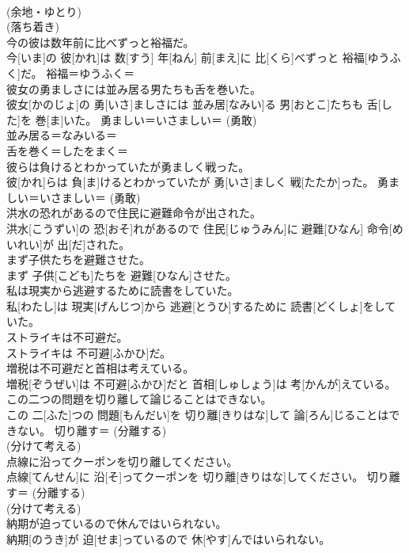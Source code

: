 \documentclass[8pt]{extreport}
\begin{document}
\begin{CJK}{UTF8}{min}
{\\	(余地・ゆとり) 
\\	(落ち着き) 
\\	今の彼は数年前に比べずっと裕福だ。	
\\	今[いま]の 彼[かれ]は 数[すう] 年[ねん] 前[まえ]に 比[くら]べずっと 裕福[ゆうふく]だ。	裕福＝ゆうふく＝ 
\\	彼女の勇ましさには並み居る男たちも舌を巻いた。	
\\	彼女[かのじょ]の 勇[いさ]ましさには 並み居[なみい]る 男[おとこ]たちも 舌[した]を 巻[ま]いた。	勇ましい＝いさましい＝ (勇敢) 
\\	並み居る＝なみいる＝ 
\\	舌を巻く＝したをまく＝ 
\\	彼らは負けるとわかっていたが勇ましく戦った。	
\\	彼[かれ]らは 負[ま]けるとわかっていたが 勇[いさ]ましく 戦[たたか]った。	勇ましい＝いさましい＝ (勇敢) 
\\	洪水の恐れがあるので住民に避難命令が出された。	
\\	洪水[こうずい]の 恐[おそ]れがあるので 住民[じゅうみん]に 避難[ひなん] 命令[めいれい]が 出[だ]された。	
\\	まず子供たちを避難させた。	
\\	まず 子供[こども]たちを 避難[ひなん]させた。	
\\	私は現実から逃避するために読書をしていた。	
\\	私[わたし]は 現実[げんじつ]から 逃避[とうひ]するために 読書[どくしょ]をしていた。	
\\	ストライキは不可避だ。	
\\	ストライキは 不可避[ふかひ]だ。	
\\	増税は不可避だと首相は考えている。	
\\	増税[ぞうぜい]は 不可避[ふかひ]だと 首相[しゅしょう]は 考[かんが]えている。	
\\	この二つの問題を切り離して論じることはできない。	
\\	この 二[ふた]つの 問題[もんだい]を 切り離[きりはな]して 論[ろん]じることはできない。	切り離す＝ (分離する) 
\\	(分けて考える) 
\\	点線に沿ってクーポンを切り離してください。	
\\	点線[てんせん]に 沿[そ]ってクーポンを 切り離[きりはな]してください。	切り離す＝ (分離する) 
\\	(分けて考える) 
\\	納期が迫っているので休んではいられない。	
\\	納期[のうき]が 迫[せま]っているので 休[やす]んではいられない。	
}
\end{CJK}
\end{document}
